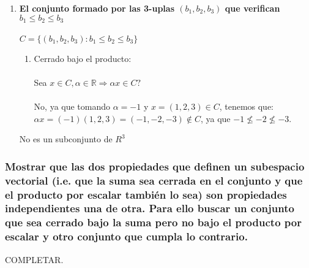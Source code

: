 \documentclass{article}
\begin{document}
\begin{enumerate}[1.]
\item \textbf{El conjunto formado por las 3-uplas $(b_1,b_2,b_3)$ que verifican $b_1 \leq b_2 \leq b_3$}  \\ \\
$C = \lbrace (b_1,b_2,b_3) : b_1 \leq b_2 \leq b_3\rbrace$
\begin{enumerate}[(1)]
\item
	Cerrado bajo el producto: \\ \\
	Sea $x \in C, \alpha \in \mathbb{R} \Rightarrow \alpha x \in C?$ \\ \\
	No, ya que tomando $\alpha = -1$ y $x = (1,2,3) \in C$, tenemos que: \\
	$\alpha x = (-1) (1,2,3) = (-1,-2,-3) \not \in C$, ya que $-1 \not \leq -2 \not \leq -3$.
\end{enumerate}
No es un subconjunto de $R^3$
\end{enumerate}

\subsubsection{Mostrar que las dos propiedades que definen un subespacio vectorial (i.e. que la suma sea cerrada en el conjunto
y que el producto por escalar también lo sea) son propiedades independientes una de otra. Para ello buscar un conjunto que sea
cerrado bajo la suma pero no bajo el producto por escalar y otro conjunto que cumpla lo contrario.}
COMPLETAR.
\end{document}
